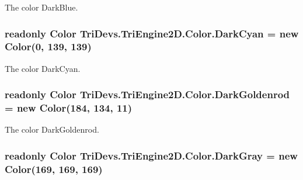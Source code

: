 The color Dark\-Blue. 

\hypertarget{struct_tri_devs_1_1_tri_engine2_d_1_1_color_a972ef3b358f0a0bb1f18b26cc158bb0f}{
\subsubsection[{Dark\-Cyan}]{\setlength{\rightskip}{0pt plus 5cm}readonly {\bf Color} Tri\-Devs.\-Tri\-Engine2\-D.\-Color.\-Dark\-Cyan = new {\bf Color}(0, 139, 139)\hspace{0.3cm}{\ttfamily [static]}}}\label{struct_tri_devs_1_1_tri_engine2_d_1_1_color_a972ef3b358f0a0bb1f18b26cc158bb0f}


The color Dark\-Cyan. 

\hypertarget{struct_tri_devs_1_1_tri_engine2_d_1_1_color_a8e405cf0783424df70d63e1230d3b608}{
\subsubsection[{Dark\-Goldenrod}]{\setlength{\rightskip}{0pt plus 5cm}readonly {\bf Color} Tri\-Devs.\-Tri\-Engine2\-D.\-Color.\-Dark\-Goldenrod = new {\bf Color}(184, 134, 11)\hspace{0.3cm}{\ttfamily [static]}}}\label{struct_tri_devs_1_1_tri_engine2_d_1_1_color_a8e405cf0783424df70d63e1230d3b608}


The color Dark\-Goldenrod. 

\hypertarget{struct_tri_devs_1_1_tri_engine2_d_1_1_color_a011640bc39f359cafab439d10da5a6ad}{
\subsubsection[{Dark\-Gray}]{\setlength{\rightskip}{0pt plus 5cm}readonly {\bf Color} Tri\-Devs.\-Tri\-Engine2\-D.\-Color.\-Dark\-Gray = new {\bf Color}(169, 169, 169)\hspace{0.3cm}{\ttfamily [static]}}}\label{struct_tri_devs_1_1_tri_engine2_d_1_1_color_a011640bc39f359cafab439d10da5a6ad}


